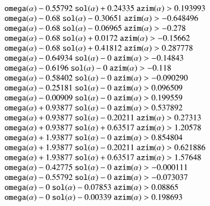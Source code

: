 $$\begin{array}{lll}
   \optt{omega}(\alpha) - 0.55792\ \optt{sol}(\alpha) + 0.24335\ \optt{azim}(\alpha) > 0.193993\\
   \optt{omega}(\alpha) - 0.68\ \optt{sol}(\alpha) - 0.30651\ \optt{azim}(\alpha) > -0.648496\\
   \optt{omega}(\alpha) - 0.68\ \optt{sol}(\alpha) - 0.06965\ \optt{azim}(\alpha) > -0.278\\
   \optt{omega}(\alpha) - 0.68\ \optt{sol}(\alpha) + 0.0172\ \optt{azim}(\alpha) > -0.15662\\
   \optt{omega}(\alpha) - 0.68\ \optt{sol}(\alpha) + 0.41812\ \optt{azim}(\alpha) > 0.287778\\
   \optt{omega}(\alpha) - 0.64934\ \optt{sol}(\alpha) - 0\ \optt{azim}(\alpha) > -0.14843\\
   \optt{omega}(\alpha) - 0.6196\ \optt{sol}(\alpha) - 0\ \optt{azim}(\alpha) > -0.118\\
   \optt{omega}(\alpha) - 0.58402\ \optt{sol}(\alpha) - 0\ \optt{azim}(\alpha) > -0.090290\\
   \optt{omega}(\alpha) - 0.25181\ \optt{sol}(\alpha) - 0\ \optt{azim}(\alpha) > 0.096509\\
   \optt{omega}(\alpha) - 0.00909\ \optt{sol}(\alpha) - 0\ \optt{azim}(\alpha) > 0.199559\\
   \optt{omega}(\alpha) + 0.93877\ \optt{sol}(\alpha) - 0\ \optt{azim}(\alpha) > 0.537892\\
   \optt{omega}(\alpha) + 0.93877\ \optt{sol}(\alpha) - 0.20211\ \optt{azim}(\alpha) > 0.27313\\
   \optt{omega}(\alpha) + 0.93877\ \optt{sol}(\alpha) + 0.63517\ \optt{azim}(\alpha) > 1.20578\\
   \optt{omega}(\alpha) + 1.93877\ \optt{sol}(\alpha) - 0\ \optt{azim}(\alpha) > 0.854804\\
   \optt{omega}(\alpha) + 1.93877\ \optt{sol}(\alpha) - 0.20211\ \optt{azim}(\alpha) > 0.621886\\
   \optt{omega}(\alpha) + 1.93877\ \optt{sol}(\alpha) + 0.63517\ \optt{azim}(\alpha) > 1.57648\\
   \optt{omega}(\alpha) - 0.42775\ \optt{sol}(\alpha) - 0\ \optt{azim}(\alpha) > -0.000111\\
   \optt{omega}(\alpha) - 0.55792\ \optt{sol}(\alpha) - 0\ \optt{azim}(\alpha) > -0.073037\\
   \optt{omega}(\alpha) - 0\ \optt{sol}(\alpha) - 0.07853\ \optt{azim}(\alpha) > 0.08865\\
   \optt{omega}(\alpha) - 0\ \optt{sol}(\alpha) - 0.00339\ \optt{azim}(\alpha) > 0.198693\\

\end{array}$$
